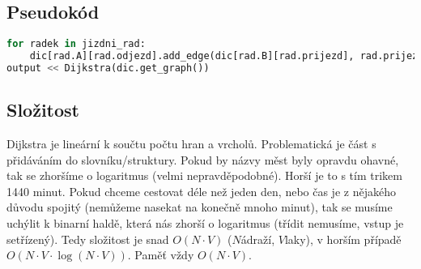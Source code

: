 \documentclass[a4paper]{article}
\begin{document}
\subsection{Pseudokód}
\begin{lstlisting}[language=Python]
for radek in jizdni_rad:
	dic[rad.A][rad.odjezd].add_edge(dic[rad.B][rad.prijezd], rad.prijezd-rad.odjezd)
output << Dijkstra(dic.get_graph())
\end{lstlisting}
\subsection{Složitost}
Dijkstra je lineární k součtu počtu hran a vrcholů. Problematická je část s přidáváním do slovníku/struktury. Pokud by názvy měst byly opravdu ohavné, tak se zhoršíme o logaritmus (velmi nepravděpodobné). Horší je to s tím trikem 1440 minut. Pokud chceme cestovat déle než jeden den, nebo čas je z nějakého důvodu spojitý (nemůžeme nasekat na konečně mnoho minut), tak se musíme uchýlit k binarní haldě, která nás zhorší o logaritmus (třídit nemusíme, vstup je setřízený). Tedy složitost je snad $O(N\cdot V)$ ($N$ádraží, $V$laky), v horším případě $O(N\cdot V \cdot \log(N\cdot V ))$. Paměť vždy $O(N\cdot V)$.
\end{document}

